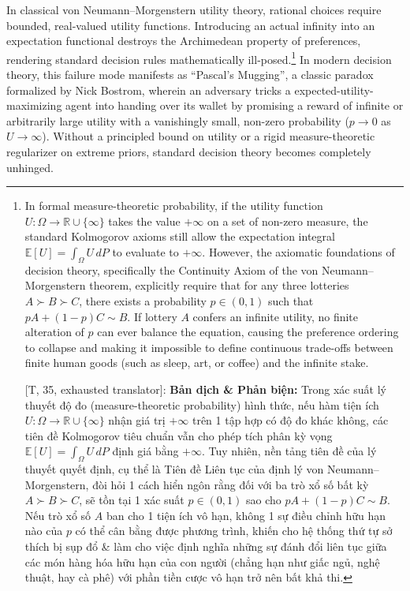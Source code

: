 \documentclass[11pt]{article}
\begin{document}
In classical von Neumann--Morgenstern utility theory, rational choices require bounded, real-valued utility functions. Introducing an actual infinity into an expectation functional destroys the Archimedean property of preferences, rendering standard decision rules mathematically ill-posed.\footnote{In formal measure-theoretic probability, if the utility function $U: \Omega \to \mathbb{R} \cup \{\infty\}$ takes the value $+\infty$ on a set of non-zero measure, the standard Kolmogorov axioms still allow the expectation integral $\mathbb{E}[U] = \int_\Omega U \, dP$ to evaluate to $+\infty$. However, the axiomatic foundations of decision theory, specifically the Continuity Axiom of the von Neumann--Morgenstern theorem, explicitly require that for any three lotteries $A \succ B \succ C$, there exists a probability $p \in (0, 1)$ such that $pA + (1 - p)C \sim B$. If lottery $A$ confers an infinite utility, no finite alteration of $p$ can ever balance the equation, causing the preference ordering to collapse and making it impossible to define continuous trade-offs between finite human goods (such as sleep, art, or coffee) and the infinite stake.
	
	\textsf{[T, 35, exhausted translator]:} \textbf{Bản dịch \& Phản biện:} Trong xác suất lý thuyết độ đo (measure-theoretic probability) hình thức, nếu hàm tiện ích $U: \Omega \to \mathbb{R} \cup \{\infty\}$ nhận giá trị $+\infty$ trên 1 tập hợp có độ đo khác không, các tiên đề Kolmogorov tiêu chuẩn vẫn cho phép tích phân kỳ vọng $\mathbb{E}[U] = \int_\Omega U \, dP$ định giá bằng $+\infty$. Tuy nhiên, nền tảng tiên đề của lý thuyết quyết định, cụ thể là Tiên đề Liên tục của định lý von Neumann--Morgenstern, đòi hỏi 1 cách hiển ngôn rằng đối với ba trò xổ số bất kỳ $A \succ B \succ C$, sẽ tồn tại 1 xác suất $p \in (0, 1)$ sao cho $pA + (1 - p)C \sim B$. Nếu trò xổ số $A$ ban cho 1 tiện ích vô hạn, không 1 sự điều chỉnh hữu hạn nào của $p$ có thể cân bằng được phương trình, khiến cho hệ thống thứ tự sở thích bị sụp đổ \& làm cho việc định nghĩa những sự đánh đổi liên tục giữa các món hàng hóa hữu hạn của con người (chẳng hạn như giấc ngủ, nghệ thuật, hay cà phê) với phần tiền cược vô hạn trở nên bất khả thi.} In modern decision theory, this failure mode manifests as ``Pascal's Mugging'', a classic paradox formalized by Nick Bostrom, wherein an adversary tricks a expected-utility-maximizing agent into handing over its wallet by promising a reward of infinite or arbitrarily large utility with a vanishingly small, non-zero probability ($p \to 0$ as $U \to \infty$). Without a principled bound on utility or a rigid measure-theoretic regularizer on extreme priors, standard decision theory becomes completely unhinged.
\end{document}
